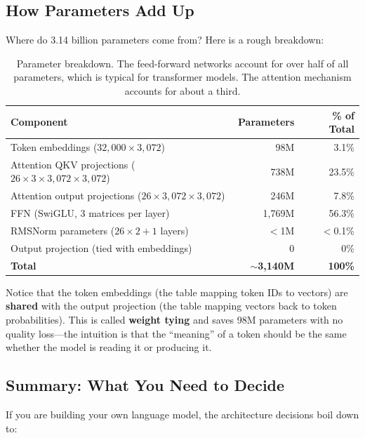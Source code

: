 \documentclass[11pt,a4paper]{article}
\begin{document}
\subsection{How Parameters Add Up}

Where do 3.14 billion parameters come from? Here is a rough breakdown:

\begin{table}[H]
\centering\small
\begin{tabular}{lrr}
\toprule
\textbf{Component} & \textbf{Parameters} & \textbf{\% of Total} \\
\midrule
Token embeddings ($32{,}000 \times 3{,}072$) & 98M & 3.1\% \\
Attention QKV projections ($26 \times 3 \times 3{,}072 \times 3{,}072$) & 738M & 23.5\% \\
Attention output projections ($26 \times 3{,}072 \times 3{,}072$) & 246M & 7.8\% \\
FFN (SwiGLU, 3 matrices per layer) & 1,769M & 56.3\% \\
RMSNorm parameters ($26 \times 2 + 1$ layers) & $<$1M & $<$0.1\% \\
Output projection (tied with embeddings) & 0 & 0\% \\
\midrule
\textbf{Total} & $\sim$\textbf{3,140M} & \textbf{100\%} \\
\bottomrule
\end{tabular}
\caption{Parameter breakdown. The feed-forward networks account for over half of all parameters, which is typical for transformer models. The attention mechanism accounts for about a third.}
\label{tab:param_breakdown}
\end{table}

\begin{tip}
Notice that the token embeddings (the table mapping token IDs to vectors) are \textbf{shared} with the output projection (the table mapping vectors back to token probabilities). This is called \textbf{weight tying} and saves 98M parameters with no quality loss---the intuition is that the ``meaning'' of a token should be the same whether the model is reading it or producing it.
\end{tip}

\subsection{Summary: What You Need to Decide}

If you are building your own language model, the architecture decisions boil down to:
\end{document}
